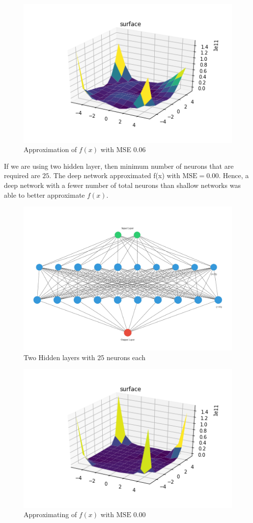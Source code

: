 \documentclass{article}
\begin{document}
\begin{figure}[h!]
    \centering
    \includegraphics[width=0.8 \textwidth]{Images/1/PredictShallow.png}
    \caption{Approximation of $f(x)$ with MSE 0.06}
    \label{fig:figure22}
\end{figure}
\newpage
If we are using two hidden layer, then minimum number of neurons that are required are $ 25 $. The deep network approximated f(x) with $\mbox{MSE} = 0.00$. Hence, a deep network with a fewer number of total neurons than shallow networks was able to better approximate $f(x)$.
\begin{figure}[h!]
    \centering
    \includegraphics[width=0.8 \textwidth]{Images/1/DeepNetwork25.jpg}
    \caption{Two Hidden layers with 25 neurons each}
    \label{fig:figure23}
\end{figure}

\begin{figure}[H]
    \centering
    \includegraphics[width=0.8 \textwidth]{Images/1/PredictDeep.png}
    \caption{Approximating of $f(x)$ with $\mbox{MSE}$ 0.00}
    \label{fig:figure24}
\end{figure}
\end{document}
